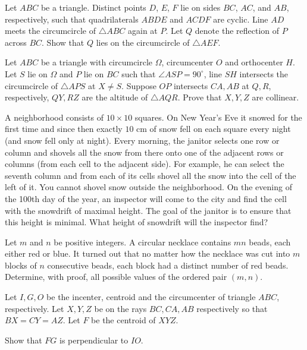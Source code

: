 \documentclass[11pt]{scrartcl}
\begin{document}
\begin{problem}[9162230842142232349]
Let $ABC$ be a triangle. Distinct points $D$, $E$, $F$ lie on sides $BC$, $AC$, and $AB$, respectively, such that quadrilaterals $ABDE$ and $ACDF$ are cyclic. Line $AD$ meets the circumcircle of $\triangle ABC$ again at $P$. Let $Q$ denote the reflection of $P$ across $BC$. Show that $Q$ lies on the circumcircle of $\triangle AEF$.
\end{problem}
\begin{problem}[3417358984411200361]
Let $ABC$ be a triangle with circumcircle $\Omega$, circumcenter $O$ and orthocenter $H$. Let $S$ lie on $\Omega$ and $P$ lie on $BC$ such that $\angle ASP=90^\circ$, line $SH$ intersects the circumcircle of $\triangle APS$ at $X\neq S$. Suppose $OP$ intersects $CA,AB$ at $Q,R$, respectively, $QY,RZ$ are the altitude of $\triangle AQR$. Prove that $X,Y,Z$ are collinear.
\end{problem}
\begin{problem}[2201137214247796233]
A neighborhood consists of $10 \times 10$ squares. On New Year's Eve it snowed for the first time and since then exactly $10$ cm of snow fell on each square every night (and snow fell only at night). Every morning, the janitor selects one row or column and shovels all the snow from there onto one of the adjacent rows or columns (from each cell to the adjacent side). For example, he can select the seventh column and from each of its cells shovel all the snow into the cell of the left of it. You cannot shovel snow outside the neighborhood. On the evening of the 100th day of the year, an inspector will come to the city and find the cell with the snowdrift of maximal height. The goal of the janitor is to ensure that this height is minimal. What height of snowdrift will the inspector find?
\end{problem}
\begin{problem}[811235233671414145]
Let $m$ and $n$ be positive integers. A circular necklace contains $mn$ beads, each either red or blue. It turned out that no matter how the necklace was cut into $m$ blocks of $n$ consecutive beads, each block had a distinct number of red beads. Determine, with proof, all possible values of the ordered pair $(m, n)$.
\end{problem}
\begin{problem}[6734490609685717062]
	Let $I,G,O$ be the incenter, centroid and the circumcenter of triangle $ABC$, respectively. Let $X,Y,Z$ be on the rays $BC, CA, AB$ respectively so that $BX=CY=AZ$. Let $F$ be the centroid of $XYZ$.

Show that $FG$ is perpendicular to $IO$.
\end{problem}
\end{document}
